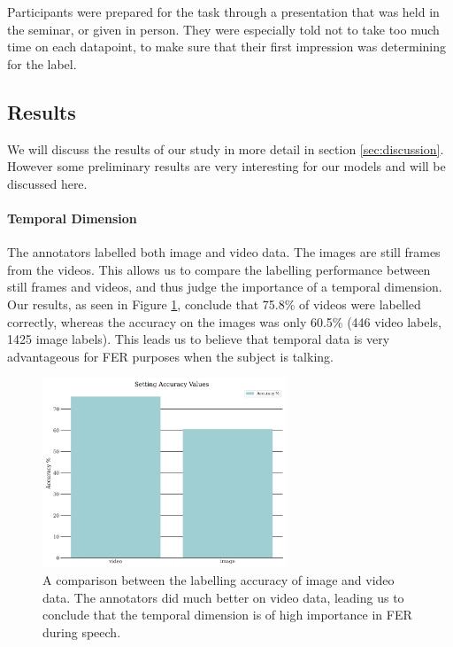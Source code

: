 Participants were prepared for the task through a presentation that was held in the seminar, or given in person. They were especially told not to take too much time on each datapoint, to make sure that their first impression was determining for the label.

\subsection{Results}
We will discuss the results of our study in more detail in section \ref{sec:discussion}. However some preliminary results are very interesting for our models and will be discussed here.

\paragraph{Temporal Dimension}
The annotators labelled both image and video data. The images are still frames from the videos. This allows us to compare the labelling performance between still frames and videos, and thus judge the importance of a temporal dimension. Our results, as seen in Figure \ref{fig:setting_overview}, conclude that 75.8\% of videos were labelled correctly, whereas the accuracy on the images was only 60.5\% (446 video labels, 1425 image labels). This leads us to believe that temporal data is very advantageous for FER purposes when the subject is talking.


\begin{figure}
    \centering
    \includegraphics[width=0.65\textwidth]{res/Setting_overview.png}
    \caption{A comparison between the labelling accuracy of image and video data. The annotators did much better on video data, leading us to conclude that the temporal dimension is of high importance in FER during speech.}
    \label{fig:setting_overview}
\end{figure}

